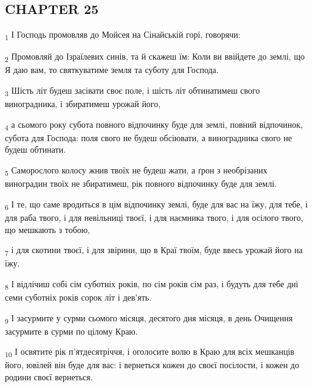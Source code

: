 \subsection{CHAPTER 25}
\begin{tcolorbox}
\textsubscript{1} І Господь промовляв до Мойсея на Сінайській горі, говорячи:
\end{tcolorbox}
\begin{tcolorbox}
\textsubscript{2} Промовляй до Ізраїлевих синів, та й скажеш їм: Коли ви ввійдете до землі, що Я даю вам, то святкуватиме земля та суботу для Господа.
\end{tcolorbox}
\begin{tcolorbox}
\textsubscript{3} Шість літ будеш засівати своє поле, і шість літ обтинатимеш свого виноградника, і збиратимеш урожай його,
\end{tcolorbox}
\begin{tcolorbox}
\textsubscript{4} а сьомого року субота повного відпочинку буде для землі, повний відпочинок, субота для Господа: поля свого не будеш обсіювати, а виноградника свого не будеш обтинати.
\end{tcolorbox}
\begin{tcolorbox}
\textsubscript{5} Саморослого колосу жнив твоїх не будеш жати, а ґрон з необрізаних виноградин твоїх не збиратимеш, рік повного відпочинку буде для землі.
\end{tcolorbox}
\begin{tcolorbox}
\textsubscript{6} І те, що саме вродиться в цім відпочинку землі, буде для вас на їжу, для тебе, і для раба твого, і для невільниці твоєї, і для наємника твого, і для осілого твого, що мешкають з тобою,
\end{tcolorbox}
\begin{tcolorbox}
\textsubscript{7} і для скотини твоєї, і для звірини, що в Краї твоїм, буде ввесь урожай його на їжу.
\end{tcolorbox}
\begin{tcolorbox}
\textsubscript{8} І відлічиш собі сім суботніх років, по сім років сім раз, і будуть для тебе дні семи суботніх років сорок літ і дев'ять.
\end{tcolorbox}
\begin{tcolorbox}
\textsubscript{9} І засурмите у сурми сьомого місяця, десятого дня місяця, в день Очищення засурмите в сурми по цілому Краю.
\end{tcolorbox}
\begin{tcolorbox}
\textsubscript{10} І освятите рік п'ятдесятріччя, і оголосите волю в Краю для всіх мешканців його, ювілей він буде для вас: і вернеться кожен до своєї посілости, і кожен до родини своєї вернеться.
\end{tcolorbox}
